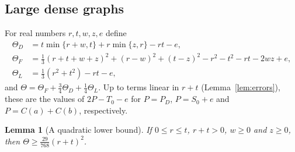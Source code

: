 \documentclass{amsart}
\newtheorem{lemma}[theorem]{Lemma}
\theoremstyle{definition}
\numberwithin{equation}{section}
\numberwithin{table}{section}
\begin{document}
\subsection{Large dense graphs}
For real numbers $r,t,w,z,e$ define
\begin{align*}
\Theta_D&=t\min\{r+w,t\}+r\min\{z,r\}-rt-e,\\
\Theta_F&=\tfrac13(r+t+w+z)^2+(r-w)^2+(t-z)^2-r^2-t^2-rt-2wz+e,\\
\Theta_L&=\tfrac13(r^2+t^2)-rt-e,
\end{align*}
and $\Theta=\Theta_F+\frac34\Theta_D+\frac14\Theta_L$. Up to terms linear in $r+t$ (Lemma~\ref{lem:errors}), these are the values of $2P-T_0-e$ for $P=P_D$, $P=S_0+e$ and $P=C(a)+C(b)$, respectively.

\begin{lemma}[A quadratic lower bound]\label{lem:quadratic}
If $0\le r\le t$, $r+t>0$, $w\ge 0$ and $z\ge 0$, then $\Theta\ge\frac{29}{768}(r+t)^2$.
\end{lemma}
\end{document}
